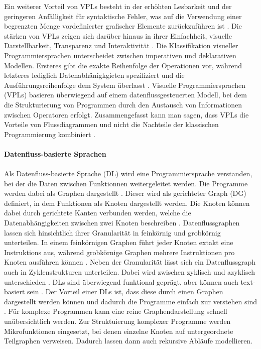 \documentclass{article}
\begin{document}
    Ein weiterer Vorteil von VPLs besteht in der erhöhten Lesbarkeit und der geringeren Anfälligkeit für syntaktische Fehler, was auf die Verwendung einer begrenzten Menge vordefinierter grafischer Elemente zurückzuführen ist \cite{10}.
    Die stärken von VPLs zeigen sich darüber hinaus in ihrer Einfachheit, visuelle Darstellbarkeit, Transparenz und Interaktivität \cite{13}.
    Die Klassifikation visueller Programmiersprachen unterscheidet zwischen imperativen und deklarativen Modellen. Ersteres gibt die exakte Reihenfolge der Operationen vor, während letzteres lediglich Datenabhänigkgieten spezifiziert und die Ausführungsreihenfolge dem System überlasst \cite{21}.
    Visuelle Programmiersprachen (VPLs) basieren überwiegend auf einem datenflussgesteuerten Modell, bei dem die Strukturierung von Programmen durch den Austausch von Informationen zwischen Operatoren erfolgt. \cite{6}
    Zusammengefasst kann man sagen, dass VPLs die Vorteile von Flussdiagrammen und nicht die Nachteile der klassischen Programmierung kombiniert \cite{13}.\\
    \\
    \textbf{Datenfluss-basierte Sprachen}\\
    \\
    Als Datenfluss-basierte Sprache (DL) wird eine Programmiersprache verstanden, bei der die Daten zwischen Funktionnen weitergeleitet werden. 
    Die Programme werden dabei als Graphen dargestellt \cite{11}.
    Dieser wird als gerichteter Graph (DG) definiert, in dem Funktionen als Knoten dargestellt werden.
    Die Knoten können dabei durch gerichtete Kanten verbunden werden, welche die Datenabhängigkeiten zwischen zwei Knoten beschreiben \cite{2}.
    Datenflussgraphen lassen sich hinsichtlich ihrer Granularität in feinkörnig und grobkörnig unterteilen. In einem feinkörnigen Graphen führt jeder Knoten extakt eine Instruktions aus, während grobkörnige Graphen mehrere Instruktionen pro Knoten ausführen können \cite{1}.
    Neben der Granularität lässt sich ein Datenflussgraph auch in Zyklenstrukturen unterteilen. 
    Dabei wird zwischen zyklisch und azyklisch unterschieden \cite{8}. %
    DLs sind überwiegend funktional geprägt, aber können auch text-basiert sein \cite{2}.
    Der Vorteil einer DLs ist, dass diese durch einen Graphen dargestellt werden können \cite{11} und dadurch die Programme einfach zur verstehen sind \cite{6}.
    Für komplexe Programmen kann eine reine Graphendarstellung schnell unübersichtlich werden. Zur Struktuierung komplexer Programme werden Mikrofunktionen eingesetzt, bei denen einzelne Knoten auf untergeordnete Teilgraphen verweisen. Dadurch lassen dann auch rekursive Abläufe modellieren. \cite{11}    
\end{document}
